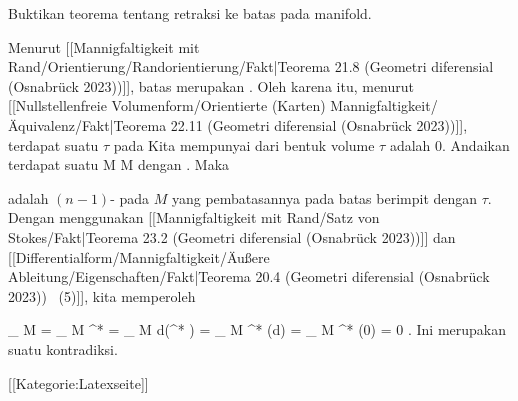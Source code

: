 {

Buktikan teorema tentang retraksi ke batas pada manifold.

}
{

Menurut
[[Mannigfaltigkeit mit Rand/Orientierung/Randorientierung/Fakt|Teorema 21.8 (Geometri diferensial (Osnabrück 2023))]],
batas
 merupakan
 {} {.}
Oleh karena itu, menurut
[[Nullstellenfreie Volumenform/Orientierte (Karten) Mannigfaltigkeit/Äquivalenz/Fakt|Teorema 22.11 (Geometri diferensial (Osnabrück 2023))]],
terdapat suatu
$\tau$ pada
 Kita mempunyai
dari bentuk volume $\tau$ adalah $0$. Andaikan terdapat suatu
\maabbdisp {\varphi} { M } { \partial M
} {}
dengan
. Maka

\mathl{\varphi^* \tau}{} adalah
$(n-1)$-
pada $M$ yang pembatasannya pada batas berimpit dengan $\tau$. Dengan menggunakan
[[Mannigfaltigkeit mit Rand/Satz von Stokes/Fakt|Teorema 23.2 (Geometri diferensial (Osnabrück 2023))]]
dan
[[Differentialform/Mannigfaltigkeit/Äußere Ableitung/Eigenschaften/Fakt|Teorema 20.4 (Geometri diferensial (Osnabrück 2023))  (5)]],
kita memperoleh

\mavergleichskettealign
{\vergleichskettealign
{
\int_{  \partial M  }  \tau
}
{ =} {
\int_{  \partial  M  }  \varphi^* \tau
}
{ =} {
\int_{   M  }  d(\varphi^* \tau)
}
{ =} {
\int_{   M  }  \varphi^* (d\tau)
}
{ =} {
\int_{   M  }  \varphi^* (0)
}
}
{
\vergleichskettefortsetzungalign
{ =} { 0
}
{ } {}
{ } {}
{ } {}
}
{}{.}
Ini merupakan suatu kontradiksi.

 }

 [[Kategorie:Latexseite]]

